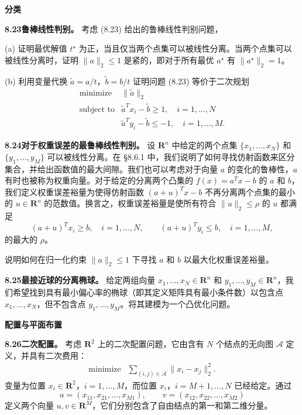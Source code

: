 \documentclass[UTF8,12pt,a4paper,fontset=fandol]{ctexart}
\begin{document}
\noindent\textbf{分类}

\noindent\textbf{8.23\quad 鲁棒线性判别。}
考虑 (8.23) 给出的鲁棒线性判别问题，

(a) 证明最优解值 $t^\star$ 为正，当且仅当两个点集可以被线性分离。当两个点集可以被线性分离时，证明 $\|a\|_2\leq 1$ 是紧的，即对于所有最优 $a^\star$ 有 $\|a^\star\|_2=1$。

(b) 利用变量代换 $\tilde a=a/t$，$\tilde b=b/t$ 证明问题 (8.23) 等价于二次规划
\[
\begin{array}{ll}
\mbox{minimize} & \|\tilde a\|_2\\
\mbox{subject to} & \tilde a^Tx_i-\tilde b\geq 1,\quad i=1,\ldots,N\\
& \tilde a^Ty_i-\tilde b\leq -1,\quad i=1,\ldots,M.
\end{array}
\]

\noindent\textbf{8.24\quad 对于权重误差的最鲁棒线性判别。}
设 $\mathbf{R}^n$ 中给定的两个点集 $\{x_1,\ldots,x_N\}$ 和 $\{y_1,\ldots,y_M\}$ 可以被线性分离。在 \S 8.6.1 中，我们说明了如何寻找仿射函数来区分集合，并给出函数值的最大间隙。我们也可以考虑对于向量 $a$ 的变化的鲁棒性，$a$ 有时也被称为权重向量。对于给定的分离两个凸集的 $f(x)=a^Tx-b$ 的 $a$ 和 $b$，我们定义权重误差裕量为使得仿射函数 $(a+u)^Tx-b$ 不再分离两个点集的最小的 $u\in\mathbf{R}^n$ 的范数值。换言之，权重误差裕量是使所有符合 $\|u\|_2\leq\rho$ 的 $u$ 都满足
\[
(a+u)^Tx_i\geq b,\quad i=1,\ldots,N,\qquad
(a+u)^Ty_i\leq b,\quad i=1,\ldots,M,
\]
的最大的 $\rho$。

说明如何在归一化约束 $\|a\|_2\leq 1$ 下寻找 $a$ 和 $b$ 以最大化权重误差裕量。

\noindent\textbf{8.25\quad 最接近球的分离椭球。}
给定两组向量 $x_1,\ldots,x_N\in\mathbf{R}^n$ 和 $y_1,\ldots,y_M\in\mathbf{R}^n$，我们希望找到具有最小偏心率的椭球（即其定义矩阵具有最小条件数）以包含点 $x_1,\ldots,x_N$，但不包含点 $y_1,\ldots,y_M$。将其建模为一个凸优化问题。

\noindent\textbf{配置与平面布置}

\noindent\textbf{8.26\quad 二次配置。}
考虑 $\mathbf{R}^2$ 上的二次配置问题，它由含有 $N$ 个结点的无向图 $\mathcal A$ 定义，并具有二次费用：
\[
\begin{array}{ll}
\mbox{minimize} & \displaystyle\sum_{(i,j)\in\mathcal A}\|x_i-x_j\|_2^2.
\end{array}
\]
变量为位置 $x_i\in\mathbf{R}^2$，$i=1,\ldots,M$，而位置 $x_i$，$i=M+1,\ldots,N$ 已经给定。通过
\[
u=(x_{11},x_{21},\ldots,x_{M1}),\qquad v=(x_{12},x_{22},\ldots,x_{M2})
\]
定义两个向量 $u,v\in\mathbf{R}^M$，它们分别包含了自由结点的第一和第二维分量。
\end{document}
